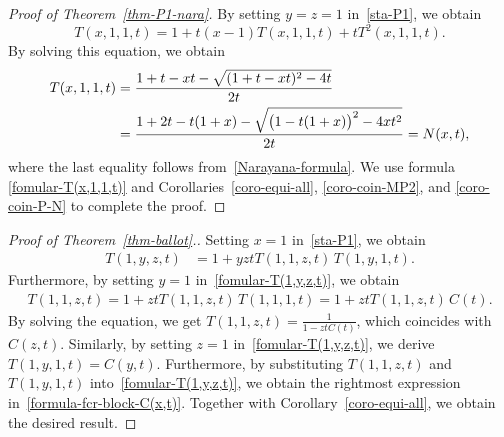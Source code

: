 \documentclass[11pt]{article}
\begin{document}
	\begin{proof}[Proof of Theorem~\ref{thm-P1-nara}]
		By setting $y=z=1$ in~\eqref{sta-P1}, we obtain
		$$
		T(x,1,1,t)=1+t(x-1)T(x,1,1,t)+tT^2(x,1,1,t).
		$$
		By solving this equation, we obtain
		\begin{align}\label{fomular-T(x,1,1,t)}
			T(x,1,1,t)&=\frac{1+t-xt-\sqrt{(1+t-xt)^2-4t}}{2t} \notag \\
			&= \frac{1+2t-t(1+x)-\sqrt{\bigl(1-t(1+x)\bigr)^{2}-4xt^{2}}}{2t}
			= N(x,t),
		\end{align}
		where the last equality follows from~\eqref{Narayana-formula}. We use formula \eqref{fomular-T(x,1,1,t)} and Corollaries~\ref{coro-equi-all}, \ref{coro-coin-MP2}, and \ref{coro-coin-P-N} to complete the proof.
	\end{proof}
	
	\begin{proof}[Proof of Theorem~\ref{thm-ballot}.] 
		Setting $x=1$ in~\eqref{sta-P1}, we obtain
		\begin{align}\label{fomular-T(1,y,z,t)}
			T(1,y,z,t) &=1+yztT(1,1,z,t)\,T(1,y,1,t).
		\end{align}
		Furthermore, by setting $y=1$ in~\eqref{fomular-T(1,y,z,t)}, we obtain
		\begin{align*}
			T(1,1,z,t)=1+ztT(1,1,z,t)\,T(1,1,1,t) = 1+ ztT(1,1,z,t)\,C(t).
		\end{align*}
		By solving the equation, we get $T(1,1,z,t)=\frac{1}{1-ztC(t)}$, 
		which coincides with $C(z,t)$. Similarly, by setting $z=1$ in~\eqref{fomular-T(1,y,z,t)}, we derive $T(1,y,1,t)= C(y,t)$. 
		Furthermore, by substituting $T(1,1,z,t)$ and $T(1,y,1,t)$ into~\eqref{fomular-T(1,y,z,t)}, we obtain the rightmost expression in~\eqref{formula-fcr-block-C(x,t)}. Together with Corollary~\ref{coro-equi-all}, we obtain the desired result.
	\end{proof}
	
\end{document}
